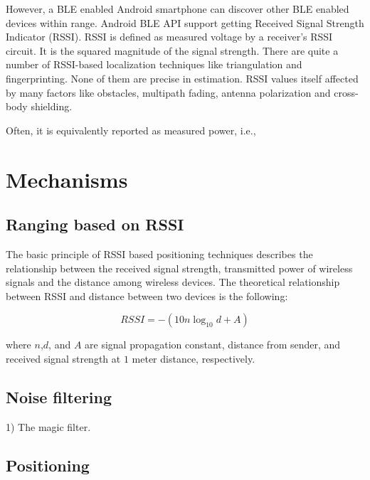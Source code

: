 \documentclass[conference,a4paper]{../../sty/IEEEtran}
\begin{document}
However, a BLE enabled Android smartphone can discover other BLE enabled devices within range. Android BLE API support getting Received Signal Strength Indicator (RSSI). RSSI is defined as measured voltage by a receiver’s RSSI circuit. It is the squared magnitude of the signal strength. There are quite a number of RSSI-based localization techniques like triangulation and fingerprinting. None of them are precise in estimation. RSSI values itself affected by many factors like obstacles, multipath fading, antenna polarization and cross-body shielding.


 Often, it is equivalently 
reported as measured power, i.e., 
\section{Mechanisms}

\subsection{Ranging based on RSSI}

The basic principle of RSSI based positioning techniques describes the relationship between the received signal strength, transmitted power of wireless signals and the distance among wireless devices. The theoretical relationship between RSSI and distance between two devices is the following: \cite{chung2007enhanced}

\begin{equation}
  RSSI = -(10n \log_{10}d + A)
 \label{eqnbasicrssi}
\end{equation}

where $n$,$d$, and $A$ are signal propagation constant, distance from sender, and received signal strength at $1$ meter distance, respectively.

\subsection{Noise filtering}

1) The magic filter.

\subsection{Positioning}
\end{document}
